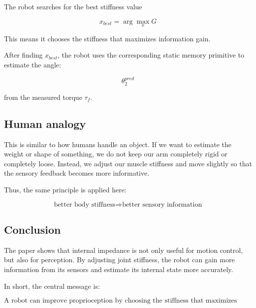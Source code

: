 The robot searches for the best stiffness value

\[
x_{best} = \arg\max_x G
\]

This means it chooses the stiffness that maximizes information gain.

After finding \( x_{best} \), the robot uses the corresponding static memory primitive to estimate the angle:

\[
\theta_2^{pred}
\]

from the measured torque \( \tau_f \).

\subsection*{Human analogy}

This is similar to how humans handle an object. If we want to estimate the weight or shape of something, we do not keep our arm completely rigid or completely loose. Instead, we adjust our muscle stiffness and move slightly so that the sensory feedback becomes more informative.

Thus, the same principle is applied here:

\[
\text{better body stiffness} \Rightarrow \text{better sensory information}
\]

\subsection*{Conclusion}

The paper shows that internal impedance is not only useful for motion control, but also for perception. By adjusting joint stiffness, the robot can gain more information from its sensors and estimate its internal state more accurately.

In short, the central message is:

\[
\boxed{\text{A robot can improve proprioception by choosing the stiffness that maximizes information gain.}}
\]